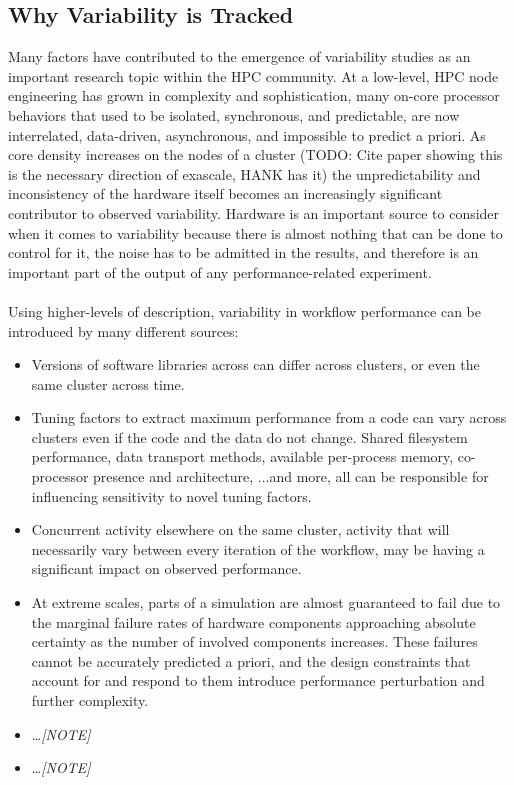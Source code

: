 \documentclass[10pt, conference, compsocconf]{IEEEtran}
\begin{document}
\subsection{Why Variability is Tracked}
Many factors have contributed to the emergence of variability studies as an 
important research topic within the HPC community. At a low-level, HPC node 
engineering has grown in complexity and sophistication, many on-core processor 
behaviors that used to be isolated, synchronous, and predictable, are now 
interrelated, data-driven, asynchronous, and impossible to predict a priori. As 
core density increases on the nodes of a cluster (TODO: Cite paper showing this 
is the necessary direction of exascale, HANK has it) the unpredictability and inconsistency 
of the hardware itself becomes an increasingly significant contributor to 
observed variability. Hardware is an important source to consider when it comes 
to variability because there is almost nothing that can be done to control for 
it, the noise has to be admitted in the results, and therefore is an important 
part of the output of any performance-related experiment.\\
\\
Using higher-levels of  description, variability in workflow 
performance can be introduced by many different sources:
\begin{itemize}
    \item Versions of software libraries across can differ across clusters, or 
    even the same cluster across time.
    \item Tuning factors to extract maximum 
    performance from a code can vary across clusters even if the code and the 
    data do not change. Shared filesystem performance, data transport methods, 
    available per-process memory, 
    co-processor presence and architecture, ...and more, all can be responsible 
    for influencing sensitivity to novel tuning factors.
    \item Concurrent activity elsewhere on the same cluster, activity that will 
    necessarily vary between every iteration of the workflow, may be having a 
    significant impact on observed performance.
    \item At extreme scales, parts of a simulation are almost guaranteed to 
    fail due to the marginal failure rates of hardware components approaching 
    absolute certainty as the number of involved components increases. These 
    failures cannot 
    be accurately predicted a priori, and the design constraints that account 
    for and respond to them introduce performance perturbation and further 
    complexity.
    \item \ldots \textit{[NOTE]}
    \item \ldots \textit{[NOTE]}
\end{itemize}
\end{document}

